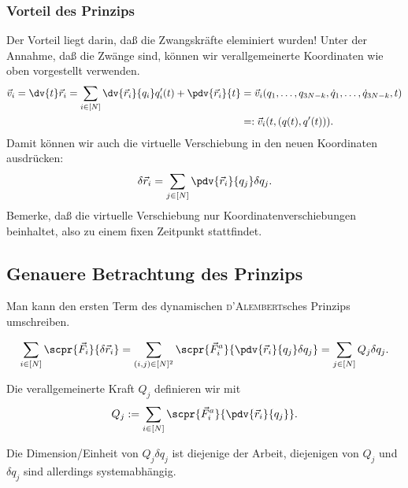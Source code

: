 \documentclass[../main.tex]{subfiles}
\begin{document}
		\subsubsection{Vorteil des Prinzips}
			Der Vorteil liegt darin, daß die Zwangskräfte eleminiert wurden! Unter der Annahme, daß die Zwänge  sind, können wir verallgemeinerte Koordinaten wie oben vorgestellt verwenden.
			\begin{align*}
				\vec{v}_i=\dv{t}\vec{r}_i=\sum_{i\in[N]}\dv{\vec{r}_i}{q_i}q_i'(t)+\pdv{\vec{r}_i}{t}&=\vec{v}_i(q_1,\dots,q_{3N-k},\dot q_1,\dots,\dot q_{3N-k},t) \\
				&=:\vec{v}_i(t,(q(t),q'(t))).
			\end{align*}
			Damit können wir auch die virtuelle Verschiebung in den neuen Koordinaten ausdrücken:
			\begin{align*}
				\delta\vec{r}_i=\sum_{j\in[N]}\pdv{\vec{r}_i}{q_j}\delta q_j.
			\end{align*}
			Bemerke, daß die virtuelle Verschiebung nur Koordinatenverschiebungen beinhaltet, also zu einem fixen Zeitpunkt stattfindet.
			 
		\subsection{Genauere Betrachtung des Prinzips}
			\begin{Behauptung}
				Man kann den ersten Term des dynamischen \textsc{d'Alembert}sches Prinzips umschreiben.
			\end{Behauptung}
			\begin{begruendung}
				\begin{align*}
					\sum_{i\in[N]}\scpr{\vec{F}_i}{\delta\vec{r}_i}=\sum_{(i,j)\in[N]^2}\scpr{\vec{F}_i^a}{\pdv{\vec{r}_i}{q_j}\delta q_j}=\sum_{j\in[N]}Q_j\delta q_j.
				\end{align*}
				\begin{info}
					Die verallgemeinerte Kraft $Q_j$ definieren wir mit 
					\begin{align*}
						Q_j:=\sum_{i\in[N]}\scpr{\vec{F}_i^a}{\pdv{\vec{r}_i}{q_j}}.
					\end{align*}
				\end{info}
				Die Dimension/Einheit von $Q_j\delta q_j$ ist diejenige der Arbeit, diejenigen von $Q_j$ und $\delta q_j$ sind allerdings systemabhängig.
			\end{begruendung} 
			
\end{document}
